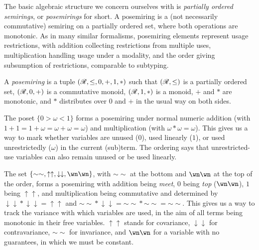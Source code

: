 The basic algebraic structure we concern ourselves with is \emph{partially
ordered semirings}, or \emph{posemirings} for short.
A posemiring is a (not necessarily commutative) semiring on a partially ordered
set, where both operations are monotonic.
As in many similar formalisms, posemiring elements represent usage restrictions,
with addition collecting restrictions from multiple uses, multiplication
handling usage under a modality, and the order giving subsumption of
restrictions, comparable to subtyping.

\begin{definition}
  A \emph{posemiring} is a tuple $(\mathscr R, \leq, 0, +, 1, *)$ such that
  $(\mathscr R, \leq)$ is a partially ordered set, $(\mathscr R, 0, +)$ is a commutative
  monoid, $(\mathscr R, 1, *)$ is a monoid, $+$ and $*$ are monotonic, and $*$
  distributes over $0$ and $+$ in the usual way on both sides.
\end{definition}

\begin{example}\label{thm:linearity}
  The poset $\{0 > \omega < 1\}$ forms a posemiring under normal numeric
  addition (with $1 + 1 = 1 + \omega = \omega + \omega = \omega$) and
  multiplication (with $\omega * \omega = \omega$).
  This gives us a way to mark whether variables are unused ($0$), used linearly
  ($1$), or used unrestrictedly ($\omega$) in the current (sub)term.
  The ordering says that unrestricted-use variables can also remain unused or
  be used linearly.
\end{example}

\begin{example}[Variance]\label{thm:variance}
  The set
  $\{{\sim\sim}, {\uparrow\uparrow}, {\downarrow\downarrow}, {\wn\wn}\}$,
  with ${\sim\sim}$ at the bottom and ${\wn\wn}$ at the top of the order, forms
  a posemiring with addition being \emph{meet}, $0$ being \emph{top}
  (${\wn\wn}$), $1$ being ${\uparrow\uparrow}$, and multiplication being
  commutative and determined by
  ${\downarrow\downarrow} * {\downarrow\downarrow} = {\uparrow\uparrow}$ and
  ${\sim\sim} * {\downarrow\downarrow} = {\sim\sim} * {\sim\sim} = {\sim\sim}$.
  This gives us a way to track the variance with which variables are used, in
  the aim of all terms being monotonic in their free variables.
  ${\uparrow\uparrow}$ stands for covariance, ${\downarrow\downarrow}$ for
  contravariance, ${\sim\sim}$ for invariance, and ${\wn\wn}$ for a variable
  with no guarantees, in which we must be constant.
\end{example}

